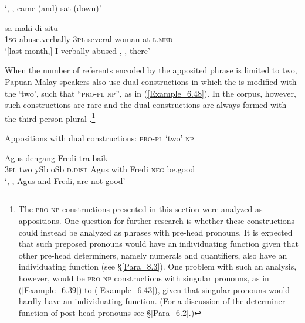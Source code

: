 \glt
‘, , came (and) sat (down)’ \textstyleExampleSource{[081006-023-CvEx.0074]}
\z

\ea
\label{Example_6.47}
\gll {\ldots} {sa} {maki} {} {} {} {di} {situ}\\ %
 { }  \textsc{1sg}  abuse.verbally  \textsc{3pl}  several  woman  at  \textsc{l.med}\\

\glt
‘[last month,] I verbally abused , , there’ \textstyleExampleSource{[080923-008-Cv.0001]}
\z


When the number of referents encoded by the apposited  phrase is limited to two, Papuan Malay speakers also use dual constructions in which the  is modified with the   ‘two’, such that ``\textsc{pro-pl}  \textsc{np}'', as in (\ref{Example_6.48}). In the corpus, however, such constructions are rare and the dual constructions are always formed with the third person plural .\footnote{The \textsc{pro} \textsc{np} constructions presented in this section were analyzed as appositions. One question for further research is whether these constructions could instead be analyzed as  phrases with pre-head pronouns. It is expected that such preposed pronouns would have an individuating function given that other pre-head determiners, namely numerals and quantifiers, also have an individuating function (see §\ref{Para_8.3}). One problem with such an analysis, however, would be \textsc{pro} \textsc{np} constructions with singular pronouns, as in (\ref{Example_6.39}) to (\ref{Example_6.43}), given that singular pronouns would hardly have an individuating function. (For a discussion of the determiner function of post-head pronouns see §\ref{Para_6.2}.)}



\begin{styleExampleTitle}
Appositions with dual constructions: \textsc{pro-pl}  ‘two’ \textsc{np}
\end{styleExampleTitle}

\ea
\label{Example_6.48}
 {} {} {} {} {Agus} {dengang} {Fredi} {tra} {baik}\\ %
 \textsc{3pl}  two  ySb  oSb  \textsc{d.dist}  Agus  with  Fredi  \textsc{neg}  be.good\\
\glt
‘, , Agus and Fredi, are not good’ \textstyleExampleSource{[081014-003-Cv.0012]}
\z


